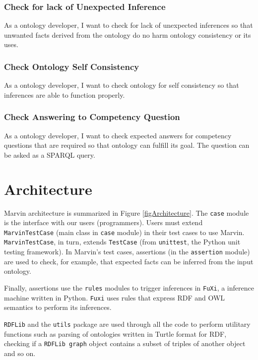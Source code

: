 \documentclass{report}
\begin{document}
\subsubsection{Check for lack of Unexpected Inference}

As a ontology developer, I want to check for lack of unexpected inferences so that unwanted facts
derived from the ontology do no harm ontology consistency or its uses.

\subsubsection{Check Ontology Self Consistency}

As a ontology developer, I want to check ontology for self consistency so that inferences are able to
function properly.

\subsubsection{Check Answering to Competency Question}

As a ontology developer, I want to check expected answers for competency questions that are required
so that ontology can fulfill its goal. The question can be asked as a SPARQL query.

\section{Architecture}

Marvin architecture is summarized in Figure \ref{figArchitecture}.
The \texttt{case} module is the interface with our users (programmers).
Users must extend \texttt{MarvinTestCase} (main class in \texttt{case} module) in their test cases to use Marvin.
\texttt{MarvinTestCase}, in turn, extends \texttt{TestCase} (from \texttt{unittest}, the Python unit testing framework).
In Marvin's test cases, assertions (in the \texttt{assertion} module) are used to check, for example, that expected facts can be inferred from the input ontology.

Finally, assertions use the \texttt{rules} modules to trigger inferences in \texttt{FuXi}, a inference machine written in Python.
\texttt{Fuxi} uses rules that express RDF and OWL semantics to perform its inferences.

\texttt{RDFLib} and the \texttt{utils} package are used through all the code to perform utilitary functions such as parsing of ontologies written in Turtle format for RDF, checking if a \texttt{RDFLib graph} object contains a subset of triples of another object and so on.
\end{document}
